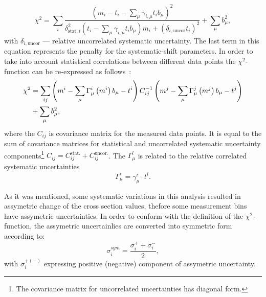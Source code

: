 \begin{equation}
 \chi^2 = \sum_i{ \frac{\left( m_i-t_i-\sum_{\mu}{\gamma_{i,\mu} t_i b_\mu} \right)^2 }{ \delta_{\text{stat},i}^2\left( t_i - \sum_\mu{\gamma_{i,\mu}t_ib_\mu} \right)m_i + \left( \delta_{i,\text{uncor}}t_i\right)^2 } } + \sum_{\mu}{b_\mu^2},
 \label{eq:chi2uncorr}
\end{equation}
with $\delta_{i,\text{uncor}}$ --- relative uncorrelated systematic uncertainty. The last term in this equation represents the penalty for the systematic-shift parameters. In order to take into account statistical correlations between different data points the $\chi^2$-function can be re-expressed as follows~\cite{Aaron:2009aa}:
\begin{align}
 \chi^2 &= \sum_{ij}{\left( m^i -\sum_{\mu}{\Gamma_\mu^i\left( m^i\right)b_\mu - t^i }\right) C^{-1}_{ij} \left( m^j -\sum_{\mu}{\Gamma_\mu^j\left( m^j\right)b_\mu - t^j }\right) }\notag\\
                                           &+ \sum_{\mu}{b_\mu^2},
 \label{eq:chi2corr}
\end{align}
where the $C_{ij}$ is covariance matrix for the measured data points. It is equal to the sum of covariance matrices for statistical and uncorrelated systematic uncertainty components\footnote{The covariance matrix for uncorrelated uncertainties has diagonal form.} $C_{ij}=C_{ij}^{\text{stat.}}+C_{ij}^{\text{uncor.}}$. The $\Gamma_\mu^l$ is related to the relative correlated systematic uncertainties
\begin{equation}
 \Gamma_{\mu}^i = \gamma_{\mu}^i \cdot t^i. 
\end{equation}

As it was mentioned, some systematic variations in this analysis resulted in assymetric change of the cross section values, thefore some measurement bins have assymetric uncertainties. In order to conform with the definition of the $\chi^2$-function, the assymetric uncertainlies are converted into symmetric form according to:
\begin{equation}
 \sigma_i^{sym} = \frac{\sigma_i^+ + \sigma_i^-}{2},
\end{equation}
with $\sigma_i^{+\left(-\right)}$ expressing positive (negative) component of assymetric uncertainty.

